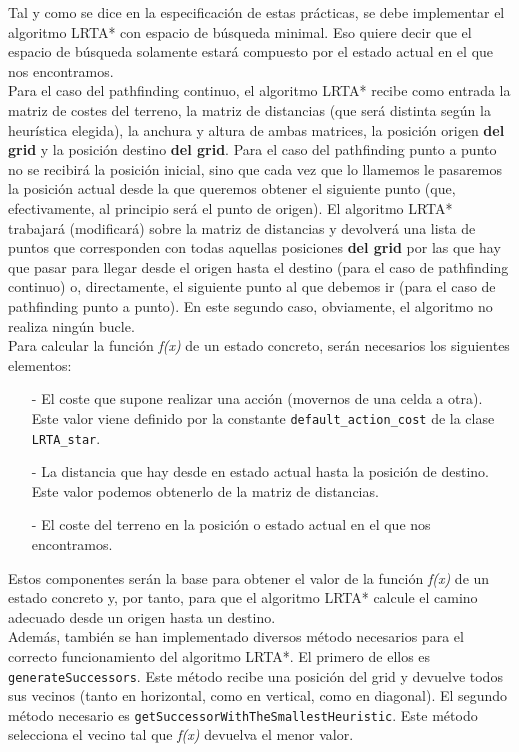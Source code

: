 Tal y como se dice en la especificación de estas prácticas, se debe implementar el algoritmo LRTA* con espacio de búsqueda minimal. Eso quiere decir que el espacio de búsqueda solamente estará compuesto por el estado actual en el que nos encontramos. \\

Para el caso del pathfinding continuo, el algoritmo LRTA* recibe como entrada la matriz de costes del terreno, la matriz de distancias (que será distinta según la heurística elegida), la anchura y altura de ambas matrices, la posición origen \textbf{del grid} y la posición destino \textbf{del grid}. Para el caso del pathfinding punto a punto no se recibirá la posición inicial, sino que cada vez que lo llamemos le pasaremos la posición actual desde la que queremos obtener el siguiente punto (que, efectivamente, al principio será el punto de origen). El algoritmo LRTA* trabajará (modificará) sobre la matriz de distancias y devolverá una lista de puntos que corresponden con todas aquellas posiciones \textbf{del grid} por las que hay que pasar para llegar desde el origen hasta el destino (para el caso de pathfinding continuo) o, directamente, el siguiente punto al que debemos ir (para el caso de pathfinding punto a punto). En este segundo caso, obviamente, el algoritmo no realiza ningún bucle. \\ 

Para calcular la función \textit{f(x)} de un estado concreto, serán necesarios los siguientes elementos:
\begin{itemize}
	\item[-] El coste que supone realizar una acción (movernos de una celda a otra). Este valor viene definido por la constante \texttt{default\_action\_cost} de la clase \texttt{LRTA\_star}.
	\item[-] La distancia que hay desde en estado actual hasta la posición de destino. Este valor podemos obtenerlo de la matriz de distancias.
	\item[-] El coste del terreno en la posición o estado actual en el que nos encontramos.
\end{itemize}

Estos componentes serán la base para obtener el valor de la función \textit{f(x)} de un estado concreto y, por tanto, para que el algoritmo LRTA* calcule el camino adecuado desde un origen hasta un destino. \\

Además, también se han implementado diversos método necesarios para el correcto funcionamiento del algoritmo LRTA*. El primero de ellos es \texttt{generateSuccessors}. Este método recibe una posición del grid y devuelve todos sus vecinos (tanto en horizontal, como en vertical, como en diagonal). El segundo método necesario es \texttt{getSuccessorWithTheSmallestHeuristic}. Este método selecciona el vecino tal que \textit{f(x)} devuelva el menor valor.

